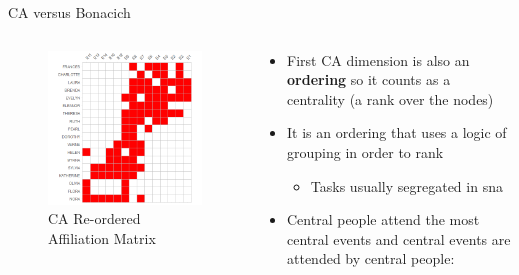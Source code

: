 \documentclass[
  ignorenonframetext,
]{beamer}
\providecommand{\tightlist}{%
  \setlength{\itemsep}{0pt}\setlength{\parskip}{0pt}}\usepackage{longtable,booktabs,array}
\begin{document}
\begin{frame}{CA versus Bonacich}
\protect\hypertarget{ca-versus-bonacich-10}{}
\begin{columns}[T]
\begin{column}{0.5\textwidth}
\begin{figure}

{\centering \includegraphics{Plots/ca-reord.png}

}

\caption{CA Re-ordered Affiliation Matrix}

\end{figure}
\end{column}

\begin{column}{0.5\textwidth}
\begin{itemize}
\tightlist
\item
  First CA dimension is also an \textbf{ordering} so it counts as a
  centrality (a rank over the nodes)
\item
  It is an ordering that uses a logic of grouping in order to rank

  \begin{itemize}
  \tightlist
  \item
    Tasks usually segregated in sna
  \end{itemize}
\item
  Central people attend the most central events and central events are
  attended by central people:


\end{itemize}
\end{column}
\end{columns}
\end{frame}
\end{document}
